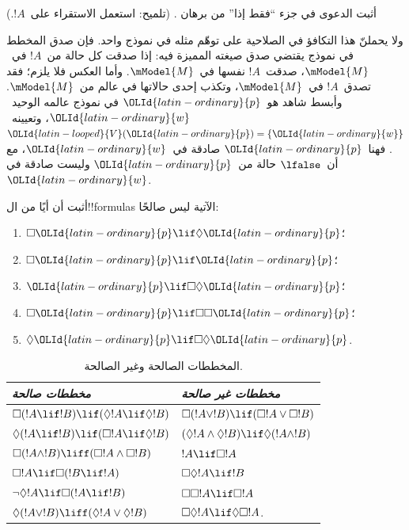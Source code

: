 \documentclass[../../../include/open-logic-section]{subfiles}
\begin{document}
\begin{prob}
  أثبت الدعوى في جزء ``فقط إذا'' من برهان
  . (تلميح: استعمل
  الاستقراء على~$!A$.)
\end{prob}

ولا يحملنّ هذا التكافؤ في الصلاحية على توهّم مثله في نموذج واحد.
فإن صدق المخطط في نموذج يقتضي صدق صيغته المميزة فيه: إذا صدقت كل
حالة من~$!A$ في~$\mModel{M}$، صدقت~$!A$ نفسها في~$\mModel{M}$.
وأما العكس فلا يلزم؛ فقد تصدق~$!A$ في~$\mModel{M}$، وتكذب
إحدى حالاتها في عالم من~$\mModel{M}$. وأبسط شاهد هو~$\OLId{latin-ordinary}{p}$ في نموذج
عالمه الوحيد~$\OLId{latin-ordinary}{w}$، وتعيينه~$\OLId{latin-looped}{V}(\OLId{latin-ordinary}{p}) = \{\OLId{latin-ordinary}{w}\}$. فهنا~$\OLId{latin-ordinary}{p}$ صادقة
في~$\OLId{latin-ordinary}{w}$، مع أن~$\lfalse$ حالة من~$\OLId{latin-ordinary}{p}$ وليست صادقة في~$\OLId{latin-ordinary}{w}$.

\begin{prob}
  أثبت أن أيًا من ال!!{formula}s الآتية ليس صالحًا:
  \begin{enumerate}
    \item[\Ax{D}:] \quad $\Box \OLId{latin-ordinary}{p} \lif \Diamond \OLId{latin-ordinary}{p}$؛
    \item[\Ax{T}:] \quad $\Box \OLId{latin-ordinary}{p} \lif \OLId{latin-ordinary}{p}$؛
    \item[\Ax{B}:] \quad $\OLId{latin-ordinary}{p} \lif \Box\Diamond \OLId{latin-ordinary}{p}$؛
    \item[\Ax{4}:] \quad $\Box \OLId{latin-ordinary}{p} \lif \Box \Box \OLId{latin-ordinary}{p}$؛
    \item[\Ax{5}:] \quad $\Diamond \OLId{latin-ordinary}{p} \lif \Box \Diamond \OLId{latin-ordinary}{p}$.
  \end{enumerate}
\end{prob}

\begin{table}[t]
    \centering
    \begin{tabular}{| l || l |}
      \hline
      {\emph{مخططات صالحة}} & {\emph{مخططات غير صالحة}} \\
      \hline\hline
      $\Box(!A \lif !B) \lif (\Diamond !A \lif \Diamond !B)$
      & $\Box (!A \lor !B) \lif (\Box !A \lor \Box !B)$ \\
      $\Diamond (!A \lif !B) \lif (\Box !A \lif \Diamond
      !B)$
      & $(\Diamond !A \land \Diamond !B) \lif \Diamond (!A
      \land !B)$\\
      $\Box (!A \land !B) \liff (\Box !A \land \Box !B)$
      & $!A \lif \Box !A$ \\
      $\Box !A \lif \Box (!B \lif !A)$
      & $\Box \Diamond !A \lif !B$ \\
      $\lnot \Diamond !A \lif \Box (!A \lif !B)$
      & $\Box \Box !A \lif \Box !A$ \\
      $\Diamond (!A \lor !B) \liff (\Diamond !A \lor
      \Diamond !B)$
      & $\Box \Diamond !A \lif \Diamond \Box !A$. \\
      \hline
    \end{tabular}
    \caption{المخططات الصالحة وغير الصالحة.}
\end{table}
\end{document}
